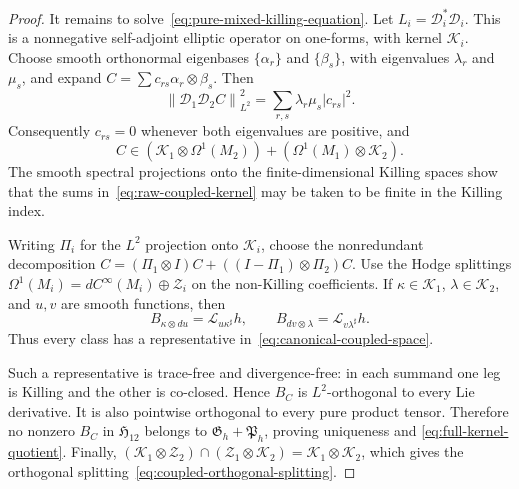 \documentclass[11pt]{amsart}
\theoremstyle{definition}
\theoremstyle{remark}
\newcommand{\norm}[1]{\left\lVert #1\right\rVert}
\begin{document}
\begin{proof}
It remains to solve~\eqref{eq:pure-mixed-killing-equation}.  Let
$L_i=\mathcal D_i^*\mathcal D_i$.  This is a nonnegative
self-adjoint elliptic operator on one-forms, with kernel
$\mathcal K_i$.  Choose smooth orthonormal eigenbases
$\{\alpha_r\}$ and $\{\beta_s\}$, with eigenvalues $\lambda_r$ and
$\mu_s$, and expand $C=\sum c_{rs}\alpha_r\otimes\beta_s$.
Then
\begin{equation}\label{eq:killing-spectral-product}
 \norm{\mathcal D_1\mathcal D_2C}_{L^2}^2
 =\sum_{r,s}\lambda_r\mu_s|c_{rs}|^2.
\end{equation}
Consequently $c_{rs}=0$ whenever both eigenvalues are positive, and
\begin{equation}\label{eq:raw-coupled-kernel}
 C\in(\mathcal K_1\otimes\Omega^1(M_2))
       +(\Omega^1(M_1)\otimes\mathcal K_2).
\end{equation}
The smooth spectral projections onto the finite-dimensional Killing
spaces show that the sums in~\eqref{eq:raw-coupled-kernel} may be
taken to be finite in the Killing index.

Writing $\Pi_i$ for the $L^2$ projection onto $\mathcal K_i$, choose
the nonredundant decomposition
$C=(\Pi_1\otimes I)C+((I-\Pi_1)\otimes\Pi_2)C$.
Use the Hodge splittings
$\Omega^1(M_i)=dC^\infty(M_i)\oplus\mathcal Z_i$ on the non-Killing
coefficients.  If $\kappa\in\mathcal K_1$,
$\lambda\in\mathcal K_2$, and $u,v$ are smooth functions, then
\begin{equation}\label{eq:coupled-exact-gauge}
 B_{\kappa\otimes du}=\mathcal L_{u\kappa^\sharp}h,
 \qquad
 B_{dv\otimes\lambda}=\mathcal L_{v\lambda^\sharp}h.
\end{equation}
Thus every class has a representative in~\eqref{eq:canonical-coupled-space}.

Such a representative is trace-free and divergence-free: in each
summand one leg is Killing and the other is co-closed.  Hence $B_C$
is $L^2$-orthogonal to every Lie derivative.  It is also pointwise
orthogonal to every pure product tensor.  Therefore no nonzero
$B_C$ in $\mathfrak H_{12}$ belongs to
$\mathfrak G_h+\mathfrak P_h$, proving uniqueness and
\eqref{eq:full-kernel-quotient}.  Finally,
$(\mathcal K_1\otimes\mathcal Z_2)\cap
 (\mathcal Z_1\otimes\mathcal K_2)
=\mathcal K_1\otimes\mathcal K_2$, which gives the orthogonal
splitting~\eqref{eq:coupled-orthogonal-splitting}.
\end{proof}
\end{document}
